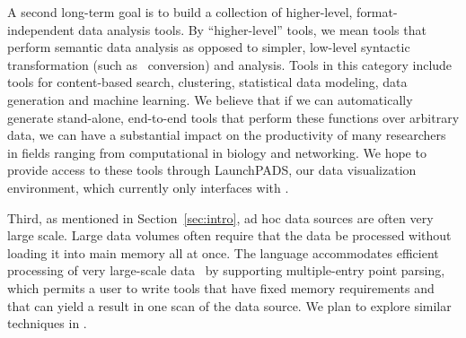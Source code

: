 A second long-term goal is to build a collection of higher-level,
format-independent data analysis tools.  By ``higher-level'' tools, we
mean tools that perform semantic data analysis as opposed to simpler,
low-level syntactic transformation (such as \xml\ conversion) and
analysis.  Tools in this category include tools for content-based
search, clustering, statistical data modeling, data generation and
machine learning.  We believe that if we can automatically generate
stand-alone, end-to-end tools that perform these functions over
arbitrary data, we can have a substantial impact on the productivity
of many researchers in fields ranging from computational in biology
and networking.  We hope to provide access to these tools through
LaunchPADS, our data visualization environment, which currently only
interfaces with \padsc{}.

Third, as mentioned in Section~\ref{sec:intro}, ad hoc data sources are often
very large scale.  Large data volumes often require that the data be
processed without loading it into main memory all at once.  The
\padsc{} language accommodates efficient processing of very
large-scale data~\cite{fisher+:pads} by supporting multiple-entry
point parsing, which permits a user to write tools that have fixed
memory requirements and that can yield a result in one scan of the
data source.  We plan to explore similar techniques in \padsml{}. 


